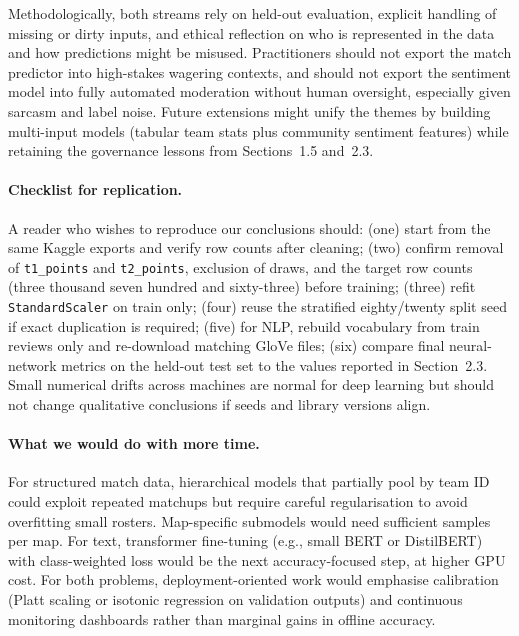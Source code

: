 \documentclass[12pt,a4paper]{article}
\begin{document}
Methodologically, both streams rely on held-out evaluation, explicit handling of missing or dirty inputs, and ethical reflection on who is represented in the data and how predictions might be misused. Practitioners should not export the match predictor into high-stakes wagering contexts, and should not export the sentiment model into fully automated moderation without human oversight, especially given sarcasm and label noise. Future extensions might unify the themes by building multi-input models (tabular team stats plus community sentiment features) while retaining the governance lessons from Sections~1.5 and~2.3.

\paragraph{Checklist for replication.}
A reader who wishes to reproduce our conclusions should: (one) start from the same Kaggle exports and verify row counts after cleaning; (two) confirm removal of \texttt{t1\_points} and \texttt{t2\_points}, exclusion of draws, and the target row counts (three thousand seven hundred and sixty-three) before training; (three) refit \texttt{StandardScaler} on train only; (four) reuse the stratified eighty/twenty split seed if exact duplication is required; (five) for NLP, rebuild vocabulary from train reviews only and re-download matching GloVe files; (six) compare final neural-network metrics on the held-out test set to the values reported in Section~2.3. Small numerical drifts across machines are normal for deep learning but should not change qualitative conclusions if seeds and library versions align.

\paragraph{What we would do with more time.}
For structured match data, hierarchical models that partially pool by team ID could exploit repeated matchups but require careful regularisation to avoid overfitting small rosters. Map-specific submodels would need sufficient samples per map. For text, transformer fine-tuning (e.g., small BERT or DistilBERT) with class-weighted loss would be the next accuracy-focused step, at higher GPU cost. For both problems, deployment-oriented work would emphasise calibration (Platt scaling or isotonic regression on validation outputs) and continuous monitoring dashboards rather than marginal gains in offline accuracy.

\newpage
\end{document}
